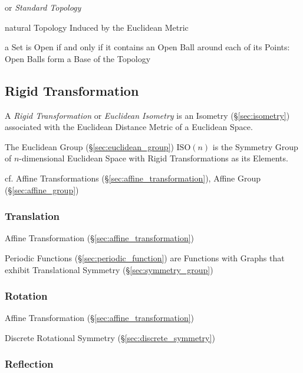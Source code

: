 or \emph{Standard Topology}

natural Topology Induced by the Euclidean Metric

a Set is Open if and only if it contains an Open Ball around each of its Points:
Open Balls form a Base of the Topology



\subsection{Rigid Transformation}\label{sec:rigid_transformation}

A \emph{Rigid Transformation} or \emph{Euclidean Isometry} is an Isometry
(\S\ref{sec:isometry}) associated with the Euclidean Distance Metric of a
Euclidean Space.

The Euclidean Group (\S\ref{sec:euclidean_group}) $\mathrm{ISO}(n)$ is the
Symmetry Group of $n$-dimensional Euclidean Space with Rigid Transformations as
its Elements.

cf. Affine Transformations (\S\ref{sec:affine_transformation}), Affine Group
(\S\ref{sec:affine_group})



\subsubsection{Translation}\label{sec:translation}

Affine Transformation (\S\ref{sec:affine_transformation})

\fist Periodic Functions (\S\ref{sec:periodic_function}) are Functions with
Graphs that exhibit Translational Symmetry (\S\ref{sec:symmetry_group})



\subsubsection{Rotation}\label{sec:rotation}

Affine Transformation (\S\ref{sec:affine_transformation})

Discrete Rotational Symmetry (\S\ref{sec:discrete_symmetry})



\subsubsection{Reflection}\label{sec:reflection}

